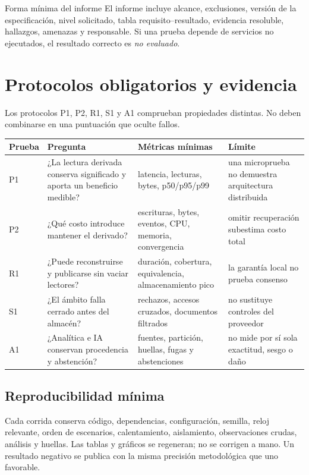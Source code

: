 \documentclass[11pt,letterpaper]{article}
\begin{document}
\begin{aviso}{Forma mínima del informe}
El informe incluye alcance, exclusiones, versión de la especificación, nivel solicitado,
tabla requisito--resultado, evidencia resoluble, hallazgos, amenazas y responsable. Si
una prueba depende de servicios no ejecutados, el resultado correcto es \emph{no evaluado}.
\end{aviso}

\section{Protocolos obligatorios y evidencia}
Los protocolos P1, P2, R1, S1 y A1 comprueban propiedades distintas. No deben combinarse
en una puntuación que oculte fallos.
\begin{longtable}{p{.09\linewidth}p{.29\linewidth}p{.25\linewidth}p{.23\linewidth}}
\toprule Prueba & Pregunta & Métricas mínimas & Límite \\ \midrule
P1 & ¿La lectura derivada conserva significado y aporta un beneficio medible? & latencia, lecturas, bytes, p50/p95/p99 & una microprueba no demuestra arquitectura distribuida \\
P2 & ¿Qué costo introduce mantener el derivado? & escrituras, bytes, eventos, CPU, memoria, convergencia & omitir recuperación subestima costo total \\
R1 & ¿Puede reconstruirse y publicarse sin vaciar lectores? & duración, cobertura, equivalencia, almacenamiento pico & la garantía local no prueba consenso \\
S1 & ¿El ámbito falla cerrado antes del almacén? & rechazos, accesos cruzados, documentos filtrados & no sustituye controles del proveedor \\
A1 & ¿Analítica e IA conservan procedencia y abstención? & fuentes, partición, huellas, fugas y abstenciones & no mide por sí sola exactitud, sesgo o daño \\ \bottomrule
\end{longtable}

\subsection{Reproducibilidad mínima}
Cada corrida conserva código, dependencias, configuración, semilla, reloj relevante,
orden de escenarios, calentamiento, aislamiento, observaciones crudas, análisis y huellas.
Las tablas y gráficos se regeneran; no se corrigen a mano. Un resultado negativo se
publica con la misma precisión metodológica que uno favorable.
\end{document}

